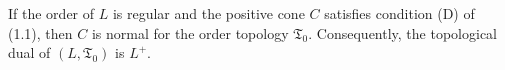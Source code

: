 If the order of $L$ is regular and the positive cone $C$ satisfies condition (D) of (1.1), then $C$ is normal for the order topology $\mathfrak{T}_0$. Consequently, the topological dual of $(L, \mathfrak{T}_0)$ is $L^+$.
